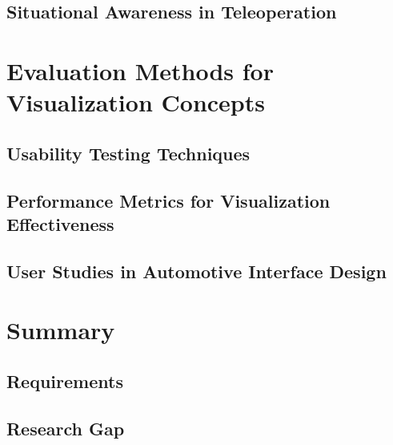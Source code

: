 \subsection{Situational Awareness in Teleoperation}

\section{Evaluation Methods for Visualization Concepts}
\subsection{Usability Testing Techniques}
\subsection{Performance Metrics for Visualization Effectiveness}
\subsection{User Studies in Automotive Interface Design}

\section{Summary}
\subsection{Requirements}
\subsection{Research Gap}


